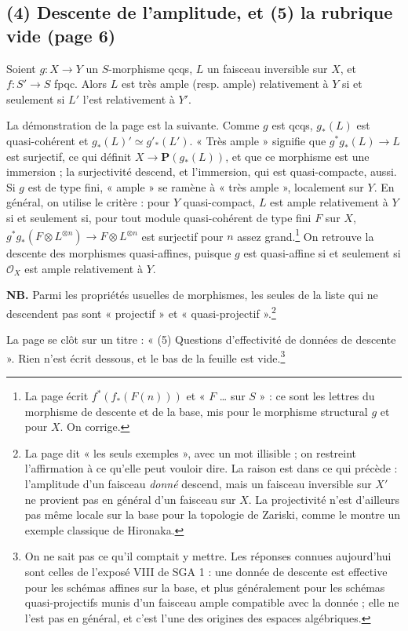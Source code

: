 \documentclass[11pt,a4paper]{article}
\begin{document}
\subsection*{(4) Descente de l'amplitude, et (5) la rubrique vide (page 6)}

Soient $g : X \to Y$ un $S$-morphisme qcqs, $L$ un faisceau inversible sur $X$,
et $f : S' \to S$ fpqc. Alors $L$ est très ample (resp. ample) relativement à
$Y$ si et seulement si $L'$ l'est relativement à $Y'$.

La démonstration de la page est la suivante. Comme $g$ est qcqs, $g_*(L)$ est
quasi-cohérent et $g_*(L)' \simeq g'_*(L')$. « Très ample » signifie que
$g^* g_*(L) \to L$ est surjectif, ce qui définit
$X \to \mathbf{P}(g_*(L))$, et que ce morphisme est une immersion ; la
surjectivité descend, et l'immersion, qui est quasi-compacte, aussi. Si $g$ est
de type fini, « ample » se ramène à « très ample », localement sur $Y$. En
général, on utilise le critère : pour $Y$ quasi-compact, $L$ est ample
relativement à $Y$ si et seulement si, pour tout module quasi-cohérent de type
fini $F$ sur $X$, $g^* g_*(F \otimes L^{\otimes n}) \to F \otimes L^{\otimes n}$
est surjectif pour $n$ assez grand.\footnote{La page écrit
$f^*(f_*(F(n)))$ et « $F$ … sur $S$ » : ce sont les lettres du morphisme de
descente et de la base, mis pour le morphisme structural $g$ et pour $X$. On
corrige.} On retrouve la descente des morphismes quasi-affines, puisque $g$ est
quasi-affine si et seulement si $\mathcal{O}_X$ est ample relativement à $Y$.

\textbf{NB.} Parmi les propriétés usuelles de morphismes, les seules de la liste
qui ne descendent pas sont « projectif » et « quasi-projectif ».\footnote{La
page dit « les seuls exemples », avec un mot illisible ; on restreint
l'affirmation à ce qu'elle peut vouloir dire. La raison est dans ce qui précède :
l'amplitude d'un faisceau \emph{donné} descend, mais un faisceau inversible sur
$X'$ ne provient pas en général d'un faisceau sur $X$. La projectivité n'est
d'ailleurs pas même locale sur la base pour la topologie de Zariski, comme le
montre un exemple classique de Hironaka.}

La page se clôt sur un titre : « (5) Questions d'effectivité de données de
descente ». Rien n'est écrit dessous, et le bas de la feuille est
vide.\footnote{On ne sait pas ce qu'il comptait y mettre. Les réponses
connues aujourd'hui sont celles de l'exposé VIII de SGA 1 : une donnée de
descente est effective pour les schémas affines sur la base, et plus
généralement pour les schémas quasi-projectifs munis d'un faisceau ample
compatible avec la donnée ; elle ne l'est pas en général, et c'est l'une des
origines des espaces algébriques.}
\end{document}
